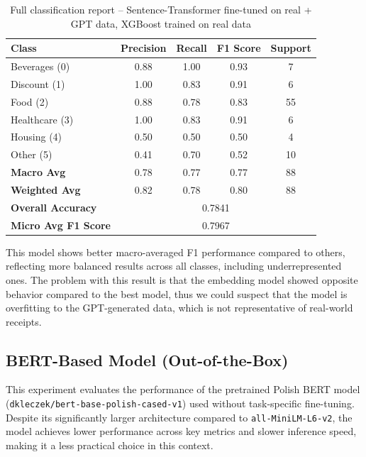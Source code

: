 \documentclass{SGGW-thesis-EN}
\begin{document}
\begin{table}[h!]
  \centering
  \caption{Full classification report – Sentence-Transformer fine-tuned on real + GPT data, XGBoost trained on real data}
  \label{tab:finetuned_st_real_clf_report}
  \begin{tabularx}{\textwidth}{lcccc}
    \toprule
    \textbf{Class} & \textbf{Precision} & \textbf{Recall} & \textbf{F1 Score} & \textbf{Support} \\
    \midrule
    Beverages (0)     & 0.88 & 1.00 & 0.93 & 7 \\
    Discount (1)      & 1.00 & 0.83 & 0.91 & 6 \\
    Food (2)          & 0.88 & 0.78 & 0.83 & 55 \\
    Healthcare (3)    & 1.00 & 0.83 & 0.91 & 6 \\
    Housing (4)       & 0.50 & 0.50 & 0.50 & 4 \\
    Other (5)         & 0.41 & 0.70 & 0.52 & 10 \\
    \midrule
    \textbf{Macro Avg}         & 0.78 & 0.77 & 0.77 & 88 \\
    \textbf{Weighted Avg}      & 0.82 & 0.78 & 0.80 & 88 \\
    \textbf{Overall Accuracy}  & \multicolumn{4}{c}{0.7841} \\
    \textbf{Micro Avg F1 Score}& \multicolumn{4}{c}{0.7967} \\
    \bottomrule
  \end{tabularx}
\end{table}

This model shows better macro-averaged F1 performance compared to others, reflecting more balanced results across all classes, including  
underrepresented ones. The problem with this result is that the embedding model showed opposite behavior compared to the best model,
thus we could suspect that the model is overfitting to the GPT-generated data, which is not representative of real-world receipts.

\subsection{BERT-Based Model (Out-of-the-Box)}

This experiment evaluates the performance of the pretrained Polish BERT model (\texttt{dkleczek/bert-base-polish-cased-v1}) used without  
task-specific fine-tuning. Despite its significantly larger architecture compared to \texttt{all-MiniLM-L6-v2}, the model achieves lower performance across  
key metrics and slower inference speed, making it a less practical choice in this context.
\end{document}

